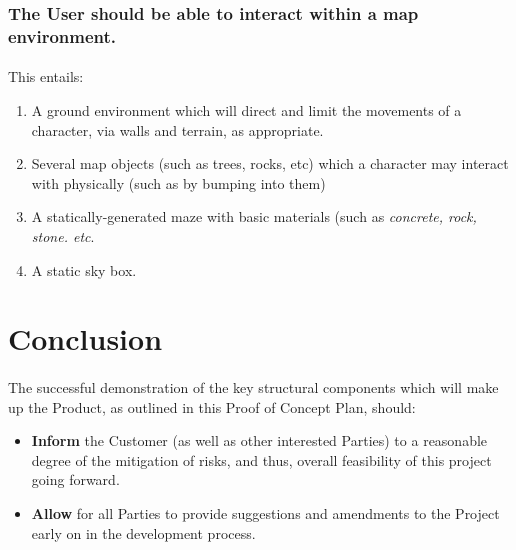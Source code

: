 \documentclass{article}
\begin{document}
\subsubsection{\textbf{The User should be able to interact within a map environment.}}
\paragraph{}This entails:

\begin{enumerate}
  \item A ground environment which will direct and limit the movements of a character, via walls and terrain, as appropriate.
  \item Several map objects (such as trees, rocks, etc) which a character may interact with physically (such as by bumping into them)
  \item A statically-generated maze with basic materials (such as \textit{concrete, rock, stone. etc}.
  \item A static sky box.
\end{enumerate}

\section{Conclusion}
\paragraph{}The successful demonstration of the key structural components which will make up the Product, as outlined in this Proof of Concept Plan, should:
\begin{itemize}
    \item \textbf{Inform} the Customer (as well as other interested Parties) to a reasonable degree of the mitigation of risks, and thus, overall feasibility of this project going forward.
    \item \textbf{Allow} for all Parties to provide suggestions and amendments to the Project early on in the development process.
\end{itemize}
\end{document}

